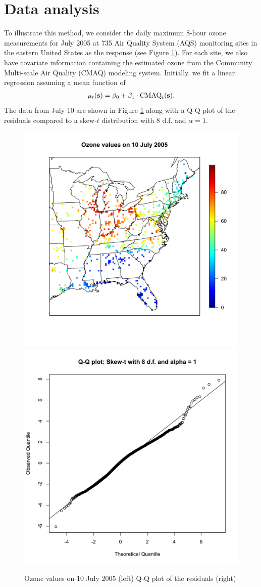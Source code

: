 \documentclass[11pt]{article}
\begin{document}
\section{Data analysis}\label{s:analysis}
To illustrate this method, we consider the daily maximum 8-hour ozone measurements for July 2005 at 735 Air Quality System (AQS) monitoring sites in the eastern United States as the response (see Figure \ref{fig:ozone}).
For each site, we also have covariate information containing the estimated ozone from the Community Multi-scale Air Quality (CMAQ) modeling system.
Initially, we fit a linear regression assuming a mean function of
\begin{align}
  \mu_t(\mbox{\bf s}) = \beta_0 + \beta_1 \cdot \text{CMAQ}_t(\mbox{\bf s}). \label{eq:datamean}
\end{align}
The data from July 10 are shown in Figure \ref{fig:ozone} along with a Q-Q plot of the residuals compared to a skew-$t$ distribution with 8 d.f. and $\alpha = 1$.
\begin{center}
\begin{figure}
  \includegraphics[width=0.5\linewidth]{plots/ozone-10jul.pdf}
  \includegraphics[width=0.5\linewidth]{plots/qq-res.pdf}
  \caption{Ozone values on 10 July 2005 (left) Q-Q plot of the residuals (right)}
  \label{fig:ozone}
\end{figure}
\end{center}
\end{document}
